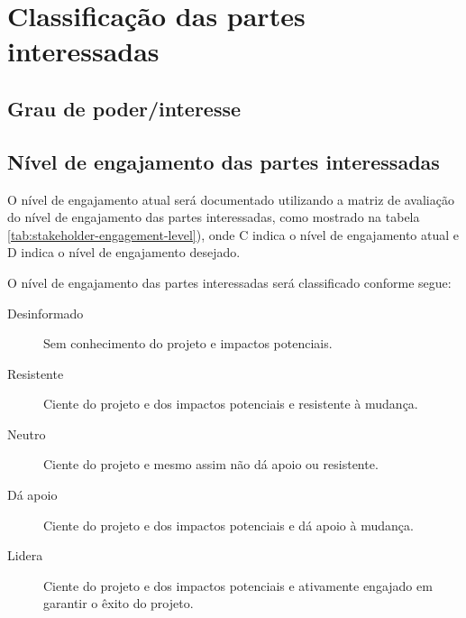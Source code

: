 \chapter{Classificação das partes interessadas}

\section{Grau de poder/interesse}
\label{sec:power-interest-grade}





\section{Nível de engajamento das partes interessadas}
\label{sec:stakeholder-engagement}

O nível de engajamento atual será documentado utilizando a matriz de avaliação do nível de engajamento das partes interessadas, como mostrado na tabela \ref{tab:stakeholder-engagement-level}), onde C indica o nível de engajamento atual e D indica o nível de engajamento desejado.

O nível de engajamento das partes interessadas será classificado conforme segue:

\begin{description}
\item[Desinformado] Sem conhecimento do projeto e impactos potenciais.
\item[Resistente] Ciente do projeto e dos impactos potenciais e resistente à mudança.
\item[Neutro] Ciente do projeto e mesmo assim não dá apoio ou resistente.
\item[Dá apoio] Ciente do projeto e dos impactos potenciais e dá apoio à mudança.
\item[Lidera] Ciente do projeto e dos impactos potenciais e ativamente engajado em garantir o êxito do projeto.
\end{description}

